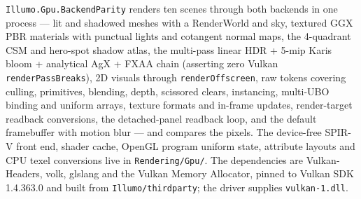 \texttt{Illumo.Gpu.BackendParity} renders ten scenes through both backends
in one process --- lit and shadowed meshes with a RenderWorld and sky,
textured GGX PBR materials with punctual lights and cotangent normal maps,
the 4-quadrant CSM and hero-spot shadow atlas, the multi-pass linear HDR +
5-mip Karis bloom + analytical AgX + FXAA chain (asserting zero Vulkan
\texttt{renderPassBreaks}), 2D
visuals through \texttt{renderOffscreen}, raw tokens covering culling,
primitives, blending, depth, scissored clears, instancing, multi-UBO binding
and uniform arrays,
texture formats and in-frame updates, render-target readback conversions, the
detached-panel readback loop, and the default framebuffer with motion blur ---
and compares the pixels. The device-free SPIR-V front end, shader cache, OpenGL
program uniform state, attribute layouts and CPU texel conversions live in
\texttt{Rendering/Gpu/}. The dependencies are Vulkan-Headers, volk, glslang and
the Vulkan Memory Allocator, pinned to Vulkan SDK 1.4.363.0 and built from
\texttt{Illumo/thirdparty}; the driver supplies \texttt{vulkan-1.dll}.

